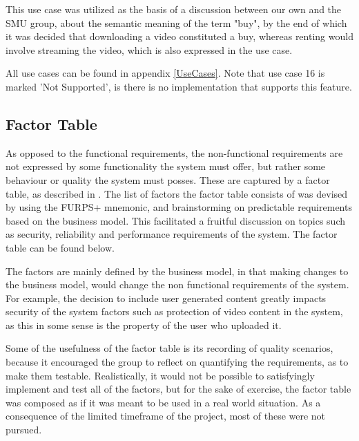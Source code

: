This use case was utilized as the basis of a discussion between our own and the SMU group, about the semantic meaning of the term "buy", by the end of which it was decided that downloading a video constituted a buy, whereas renting would involve streaming the video, which is also expressed in the use case.

All use cases can be found in appendix \ref{UseCases}. Note that use case 16 is marked 'Not Supported', is there is no implementation that supports this feature.

\subsection{Factor Table}
\label{FactorTable}
As opposed to the functional requirements, the non-functional requirements are not expressed by some functionality the system must offer, but rather some behaviour or quality the system must posses. These are captured by a factor table, as described in \cite[33,1]{OOAD}. The list of factors the factor table consists of was devised by using the FURPS+ \cite[5,4]{OOAD} mnemonic, and brainstorming on predictable requirements based on the business model. This facilitated a fruitful discussion on topics such as security, reliability and performance requirements of the system. The factor table can be found below.

The factors are mainly defined by the business model, in that making changes to the business model, would change the non functional requirements of the system.  For example, the decision to include user generated content greatly impacts security of the system factors such as protection of video content in the system, as this in some sense is the property of the user who uploaded it.

Some of the usefulness of the factor table is its recording of quality scenarios, because it encouraged the group to reflect on quantifying the requirements, as to make them testable. Realistically, it would not be possible to satisfyingly implement and test all of the factors, but for the sake of exercise, the factor table was composed as if it was meant to be used in a real world situation. As a consequence of the limited timeframe of the project, most of these were not pursued.

